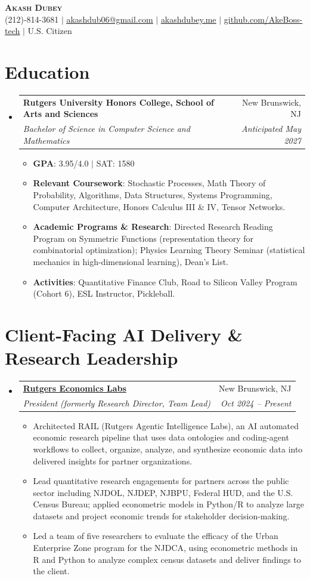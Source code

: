 \documentclass[letterpaper,11pt]{article}
\makeatletter
\newcommand{\resumeItem}[1]{
  \item\small{
    {#1 \vspace{-2pt}}
  }
}
\newcommand{\resumeSubheading}[4]{
  \vspace{-2pt}\item
    \begin{tabular*}{0.97\textwidth}[t]{l@{\extracolsep{\fill}}r}
      \textbf{#1} & #2 \\
      \textit{\small#3} & \textit{\small #4} \\
    \end{tabular*}\vspace{-7pt}
}
\newcommand{\resumeSubHeadingListStart}{\begin{itemize}[leftmargin=0.15in, label={}]}
\newcommand{\resumeSubHeadingListEnd}{\end{itemize}}
\newcommand{\resumeItemListStart}{\begin{itemize}}
\newcommand{\resumeItemListEnd}{\end{itemize}\vspace{-5pt}}
\makeatother
\begin{document}
\begin{center}
    \textbf{\Huge \scshape Akash Dubey} \\ \vspace{1pt}
    \small (212)-814-3681 $|$ \href{mailto:akashdub06@gmail.com}{\underline{akashdub06@gmail.com}} $|$
    \href{https://akashdubey.me/}{\underline{akashdubey.me}} $|$
    \href{https://github.com/AkeBoss-tech}{\underline{github.com/AkeBoss-tech}} $|$
    \small U.S. Citizen
\end{center}
\section{Education}
  \resumeSubHeadingListStart
    \resumeSubheading
      {Rutgers University Honors College, School of Arts and Sciences}{New Brunswick, NJ}
      {Bachelor of Science in Computer Science and Mathematics}{Anticipated May 2027}
      \resumeItemListStart
        \resumeItem{\textbf{GPA}: 3.95/4.0 $|$ SAT: 1580}
        \resumeItem{\textbf{Relevant Coursework}: Stochastic Processes, Math Theory of Probability, Algorithms, Data Structures, Systems Programming, Computer Architecture, Honors Calculus III \& IV, Tensor Networks.}
        \resumeItem{\textbf{Academic Programs \& Research}: Directed Research Reading Program on Symmetric Functions (representation theory for combinatorial optimization); Physics Learning Theory Seminar (statistical mechanics in high-dimensional learning), Dean's List.}
        \resumeItem{\textbf{Activities}: Quantitative Finance Club, Road to Silicon Valley Program (Cohort 6), ESL Instructor, Pickleball.}
      \resumeItemListEnd
  \resumeSubHeadingListEnd
\section{Client-Facing AI Delivery \& Research Leadership}
  \resumeSubHeadingListStart
  \resumeSubheading
      {\href{https://rutgerseconomics.org}{Rutgers Economics Labs}}{New Brunswick, NJ}
      {President (formerly Research Director, Team Lead)}{Oct 2024 -- Present}
      \resumeItemListStart
        \resumeItem{Architected RAIL (Rutgers Agentic Intelligence Labs), an AI automated economic research pipeline that uses data ontologies and coding-agent workflows to collect, organize, analyze, and synthesize economic data into delivered insights for partner organizations.}
        \resumeItem{Lead quantitative research engagements for partners across the public sector including NJDOL, NJDEP, NJBPU, Federal HUD, and the U.S. Census Bureau; applied econometric models in Python/R to analyze large datasets and project economic trends for stakeholder decision-making.}
        \resumeItem{Led a team of five researchers to evaluate the efficacy of the Urban Enterprise Zone program for the NJDCA, using econometric methods in R and Python to analyze complex census datasets and deliver findings to the client.}
      \resumeItemListEnd
  \resumeSubHeadingListEnd
\end{document}
